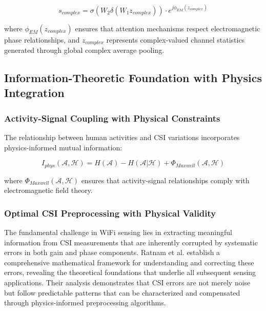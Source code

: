 \documentclass[journal]{IEEEtran}
\begin{document}
\begin{equation}
s_{complex} = \sigma(W_2 \delta(W_1 z_{complex})) \cdot e^{j\phi_{EM}(z_{complex})}
\label{eq:complex_se_attention}
\end{equation}

where $\phi_{EM}(z_{complex})$ ensures that attention mechanisms respect electromagnetic phase relationships, and $z_{complex}$ represents complex-valued channel statistics generated through global complex average pooling.

\subsection{Information-Theoretic Foundation with Physics Integration}

\subsubsection{Activity-Signal Coupling with Physical Constraints}

The relationship between human activities and CSI variations incorporates physics-informed mutual information:

\begin{equation}
I_{phys}(\mathcal{A}, \mathcal{H}) = H(\mathcal{A}) - H(\mathcal{A}|\mathcal{H}) + \Phi_{Maxwell}(\mathcal{A}, \mathcal{H})
\label{eq:mutual_information_physics}
\end{equation}

where $\Phi_{Maxwell}(\mathcal{A}, \mathcal{H})$ ensures that activity-signal relationships comply with electromagnetic field theory.

\subsubsection{Optimal CSI Preprocessing with Physical Validity}

The fundamental challenge in WiFi sensing lies in extracting meaningful information from CSI measurements that are inherently corrupted by systematic errors in both gain and phase components. Ratnam et al. \cite{ratnam2024optimal} establish a comprehensive mathematical framework for understanding and correcting these errors, revealing the theoretical foundations that underlie all subsequent sensing applications. Their analysis demonstrates that CSI errors are not merely noise but follow predictable patterns that can be characterized and compensated through physics-informed preprocessing algorithms.
\end{document}
